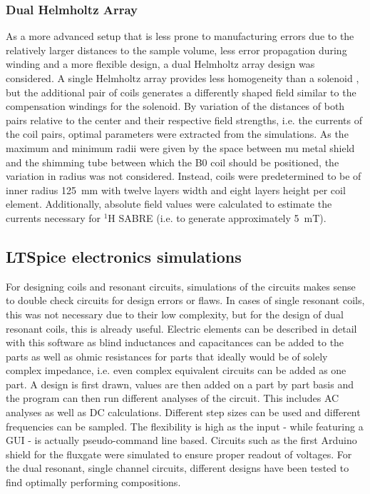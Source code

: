         \subsubsection{Dual Helmholtz Array}
        \label{simulations:DualHelmholtzArray}
        As a more advanced setup that is less prone to manufacturing errors due to the relatively larger distances to the sample volume, less error propagation during winding and a more flexible design, a dual Helmholtz array design was considered. A single Helmholtz array provides less homogeneity than a solenoid \cite{bienkowski_techniczne_2015}, but the additional pair of coils generates a differently shaped field similar to the compensation windings for the solenoid. By variation of the distances of both pairs relative to the center and their respective field strengths, i.e. the currents of the coil pairs, optimal parameters were extracted from the simulations. As the maximum and minimum radii were given by the space between mu metal shield and the shimming tube between which the B0 coil should be positioned, the variation in radius was not considered. Instead, coils were predetermined to be of inner radius \SI{125}{\mm} with twelve layers width and eight layers height per coil element.
        Additionally, absolute field values were calculated to estimate the currents necessary for $^{1}$H SABRE (i.e. to generate approximately \SI{5}{\milli\tesla}).
    \subsection{LTSpice electronics simulations}
        For designing coils and resonant circuits, simulations of the circuits makes sense to double check circuits for design errors or flaws. In cases of single resonant coils, this was not necessary due to their low complexity, but for the design of dual resonant coils, this is already useful. Electric elements can be described in detail with this software as blind inductances and capacitances can be added to the parts as well as ohmic resistances for parts that ideally would be of solely complex impedance, i.e. even complex equivalent circuits can be added as one part.
        A design is first drawn, values are then added on a part by part basis and the program can then run different analyses of the circuit. This includes AC analyses as well as DC calculations. Different step sizes can be used and different frequencies can be sampled. The flexibility is high as the input - while featuring a GUI - is actually pseudo-command line based. Circuits such as the first Arduino shield for the fluxgate were simulated to ensure proper readout of voltages. For the dual resonant, single channel circuits, different designs have been tested to find optimally performing compositions.
